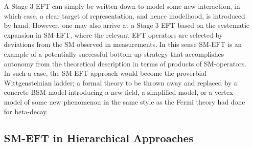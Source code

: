 A Stage 3 EFT can simply be written down to model some new interaction, in which case, a clear target of representation, and hence modelhood, is introduced by hand. 
However, one may also arrive at a Stage 3 EFT based on the systematic expansion in SM-EFT,
where the relevant EFT operators are selected by deviations from the SM observed in measurements. 
In this sense SM-EFT is an example of a potentially successful bottom-up strategy that accomplishes autonomy from the theoretical description in terms of products of SM-operators. 
In such a case, the SM-EFT approach would become the proverbial Wittgensteinian ladder; a formal theory to be thrown away and replaced by a concrete BSM model introducing a new field, a simplified model, or a vertex model of some new phenomenon in the same style as the Fermi theory had done for beta-decay.


\subsection{SM-EFT in Hierarchical Approaches}
\label{sub:modelhood}

